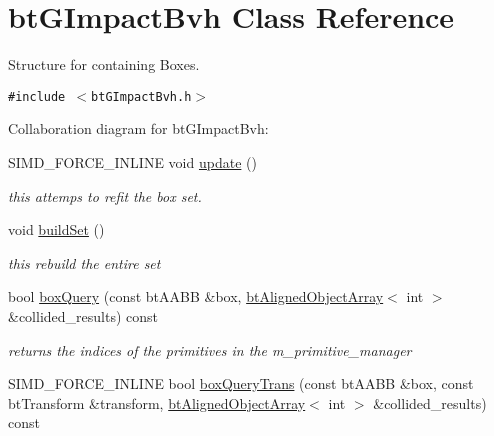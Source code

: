 \hypertarget{classbt_g_impact_bvh}{
\section{btGImpactBvh Class Reference}
\label{classbt_g_impact_bvh}
}
Structure for containing Boxes.  


{\tt \#include $<$btGImpactBvh.h$>$}

Collaboration diagram for btGImpactBvh:\begin{CompactItemize}
\item 
SIMD\_\-FORCE\_\-INLINE void \hyperlink{classbt_g_impact_bvh_c0511b84c8722348fe4295b2a8f40c81}{update} ()
\begin{CompactList}\small\item\em this attemps to refit the box set. \item\end{CompactList}\item 
\hypertarget{classbt_g_impact_bvh_09c889dd33db157383fb5bdb17d58d51}{
void \hyperlink{classbt_g_impact_bvh_09c889dd33db157383fb5bdb17d58d51}{buildSet} ()}
\label{classbt_g_impact_bvh_09c889dd33db157383fb5bdb17d58d51}

\begin{CompactList}\small\item\em this rebuild the entire set \item\end{CompactList}\item 
\hypertarget{classbt_g_impact_bvh_783a6189f8237a27a7f9255379eda48f}{
bool \hyperlink{classbt_g_impact_bvh_783a6189f8237a27a7f9255379eda48f}{boxQuery} (const btAABB \&box, \hyperlink{classbt_aligned_object_array}{btAlignedObjectArray}$<$ int $>$ \&collided\_\-results) const }
\label{classbt_g_impact_bvh_783a6189f8237a27a7f9255379eda48f}

\begin{CompactList}\small\item\em returns the indices of the primitives in the m\_\-primitive\_\-manager \item\end{CompactList}\item 
\hypertarget{classbt_g_impact_bvh_78ffbcc96d7bcb3998bac7eff4f816b4}{
SIMD\_\-FORCE\_\-INLINE bool \hyperlink{classbt_g_impact_bvh_78ffbcc96d7bcb3998bac7eff4f816b4}{boxQueryTrans} (const btAABB \&box, const btTransform \&transform, \hyperlink{classbt_aligned_object_array}{btAlignedObjectArray}$<$ int $>$ \&collided\_\-results) const }
\label{classbt_g_impact_bvh_78ffbcc96d7bcb3998bac7eff4f816b4}


\end{CompactItemize}
